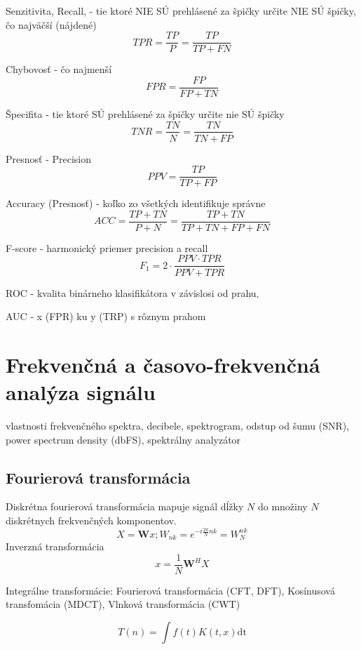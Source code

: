 Senzitivita, Recall, - tie ktoré NIE SÚ prehlásené za špičky určite NIE SÚ špičky, čo najväčší (nájdené)
$$ TPR = \frac{TP}{P} = \frac{TP}{TP + FN} $$

Chybovosť - čo najmenší
$$  FPR = \frac{FP}{FP + TN}$$

Špecifita - tie ktoré SÚ prehlásené za špičky určite nie SÚ špičky
$$ TNR = \frac{TN}{N} = \frac{TN}{TN + FP} $$

Presnosť - Precision
$$ PPV = \frac{TP}{TP + FP} $$

Accuracy (Presnosť) - koľko zo všetkých identifikuje správne
$$ ACC = \frac{TP + TN}{P + N} = \frac{TP + TN}{TP + TN + FP + FN} $$

F-score - harmonický priemer precision a recall
$$ F_1 = 2 \cdot \frac{PPV \cdot TPR}{PPV + TPR}$$

ROC - kvalita binárneho klasifikátora v závislosi od prahu, 

AUC - x (FPR) ku y (TRP) s rôznym prahom
\cite{anomaly-detection-algorithms}
\cite{wsn-outlier-detection-survey}

\section{Frekvenčná a časovo-frekvenčná analýza signálu}
\cite{time-series-analysis}
vlastnosti frekvenčného spektra,
decibele, 
spektrogram,
odstup od šumu (SNR),
power spectrum density (dbFS),
spektrálny analyzátor

\subsection{Fourierová transformácia}
Diskrétna fourierová transformácia mapuje signál dĺžky $N$ do množiny $N$ diskrétnych frekvenčných komponentov. \cite{signal-processing}
\begin{equation}
X = \mathbf{W}x; W_{nk} = e^{-i\frac{2\pi}{N}nk} = W_N^{nk}
\end{equation}
Inverzná transformácia
\begin{equation}
x = \frac{1}{N}\mathbf{W}^H X
\end{equation}

Integrálne transformácie: Fourierová transformácia (CFT, DFT), Kosínusová transfomácia (MDCT), Vlnková transformácia (CWT) \cite{dct} \cite{casove-frekvencia-analyza-signalu}

\begin{equation}
T(n) = \int{f(t) K(t,x) \mathrm{dt}}
\end{equation}


